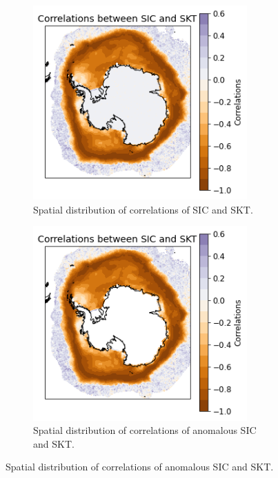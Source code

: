 \documentclass[../main.tex]{subfiles}
\begin{document}
\begin{figure}[H]
\centering
\begin{subfigure}[h!]{0.49\textwidth}
\centering
\includegraphics[width=0.9\textwidth]{images/week8/lres/corr_sic_skt_longterm_spatial}
\caption{Spatial distribution of correlations of SIC and SKT.}
\end{subfigure}
\begin{subfigure}[h!]{0.49\textwidth}
\centering
\includegraphics[width=0.9\textwidth]{images/week8/lres/corr_sic_skt_longterm_spatial_anmomalous}
\caption{Spatial distribution of correlations of anomalous SIC and SKT.}

\end{subfigure}
\end{figure}
\end{document}
